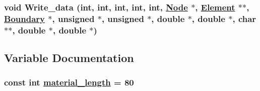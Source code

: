 \hypertarget{oldpreprocess_8C_a7}{
\subsubsection[Write\_\-data]{\setlength{\rightskip}{0pt plus 5cm}void Write\_\-data (int, int, int, int, int, \hyperlink{classNode}{Node} $\ast$, \hyperlink{classElement}{Element} $\ast$$\ast$, \hyperlink{classBoundary}{Boundary} $\ast$, unsigned $\ast$, unsigned $\ast$, double $\ast$, double $\ast$, char $\ast$$\ast$, double $\ast$, double $\ast$)}}
\label{oldpreprocess_8C_a7}




\subsection{Variable Documentation}
\hypertarget{oldpreprocess_8C_a0}{
\subsubsection[material\_\-length]{\setlength{\rightskip}{0pt plus 5cm}const int \hyperlink{preprocess_8C_a0}{material\_\-length} = 80}}
\label{oldpreprocess_8C_a0}



